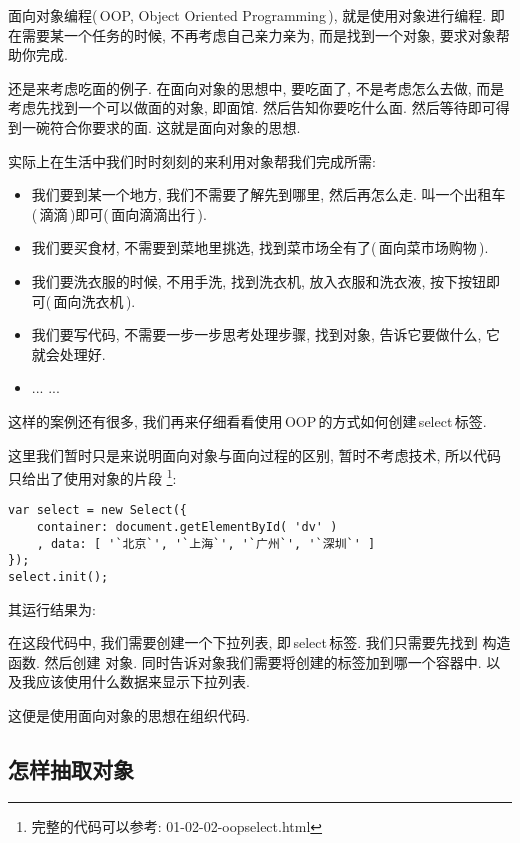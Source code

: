 面向对象编程(\,OOP, Object Oriented Programming\,), 就是使用对象进行编程. 即在需要某一个任务的时候, 
不再考虑自己亲力亲为, 而是找到一个对象, 要求对象帮助你完成. 

还是来考虑吃面的例子. 在面向对象的思想中, 要吃面了, 不是考虑怎么去做, 而是考虑先找到一个可以做面的对象,
即面馆. 然后告知你要吃什么面. 然后等待即可得到一碗符合你要求的面. 这就是面向对象的思想.

实际上在生活中我们时时刻刻的来利用对象帮我们完成所需:
%
\begin{itemize}
\item 我们要到某一个地方, 我们不需要了解先到哪里, 然后再怎么走. 叫一个出租车(\,滴滴\,)即可(\,面向滴滴出行\,).
\item 我们要买食材, 不需要到菜地里挑选, 找到菜市场全有了(\,面向菜市场购物\,).
\item 我们要洗衣服的时候, 不用手洗, 找到洗衣机, 放入衣服和洗衣液, 按下按钮即可(\,面向洗衣机\,).
\item 我们要写代码, 不需要一步一步思考处理步骤, 找到对象, 告诉它要做什么, 它就会处理好. 
\item ... ...
\end{itemize}
%
这样的案例还有很多, 我们再来仔细看看使用\,OOP\,的方式如何创建\,select\,标签.

这里我们暂时只是来说明面向对象与面向过程的区别, 暂时不考虑技术, 所以代码只给出了使用对象的片段%
%
\footnote{完整的代码可以参考: \textsf{01-02-02-oopselect.html}}:
%
\begin{lstlisting}
var select = new Select({
    container: document.getElementById( 'dv' )
    , data: [ '`北京`', '`上海`', '`广州`', '`深圳`' ] 
});
select.init();
\end{lstlisting}%
%
其运行结果为:\\
%

\noindent
在这段代码中, 我们需要创建一个下拉列表, 即\,select\,标签. 我们只需要先找到\,\,构造函数.
然后创建\,\,对象. 同时告诉对象我们需要将创建的标签加到哪一个容器中. 
以及我应该使用什么数据来显示下拉列表.

这便是使用面向对象的思想在组织代码.



\subsection{怎样抽取对象}

